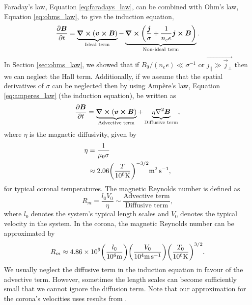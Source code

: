 Faraday's law, Equation \eqref{eq:faradays_law}, can be combined with Ohm's law, Equation \eqref{eq:ohms_law}, to give the induction equation,
\begin{equation}
    \label{eq:induction_equation}
    \pdv{\boldsymbol{B}}{t}=\underbrace{\curl(\boldsymbol{v}\cross\boldsymbol{B})}_{\text{Ideal term}}-\underbrace{\curl(\frac{\boldsymbol{j}}{\sigma}+\frac{1}{n_ee}\boldsymbol{j}\cross\boldsymbol{B})}_{\text{Non-ideal term}}.
\end{equation}
In Section \ref{sec:ohms_law}, we showed that if $B_0 / (n_e e) \ll \sigma^{-1}$ or $\vec{j_{||}\gg\vec{j}_\perp}$ then we can neglect the Hall term. Additionally, if we assume that the spatial derivatives of $\sigma$ can be neglected then by using Amp\`ere's law, Equation \eqref{eq:amperes_law} (the induction equation), be written as
\begin{equation}
    \pdv{\vec{B}}{t}=\underbrace{\curl(\vec{v}\cross\vec{B})}_{\text{Advective term}}+\underbrace{\eta\laplacian\vec{B}}_{\text{Diffusive term}},
\end{equation}
where $\eta$ is the magnetic diffusivity, given by
\begin{equation}
    \label{eq:eta_typical_values}
    \begin{aligned}
        \eta&=\frac{1}{\mu_0\sigma} \\
        &\approx 2.06\qty(\frac{T}{10^6\si{.K}})^{-3/2}\si{.m^2.s^{-1}},
    \end{aligned}
\end{equation}
for typical coronal temperatures. The magnetic Reynolds number is defined as
\begin{equation}
    R_m=\frac{l_0V_0}{\eta}\sim\frac{\text{Advective term}}{\text{Diffusive term}},
\end{equation}
where $l_0$ denotes the system's typical length scales and $V_0$ denotes the typical velocity in the system. In the corona, the magnetic Reynolds number can be approximated by
\begin{equation}
    \label{eq:mag_reynolds_number}
    R_m\approx4.86\times10^{9}\qty(\frac{l_0}{10^6\si{.m}})\qty(\frac{V_0}{10^4\si{.m.s^{-1}}})\qty(\frac{T_0}{10^6\si{.K}})^{3/2}.
\end{equation}
We usually neglect the diffusive term in the induction equation in favour of the advective term. However, sometimes the length scales can become sufficiently small that we cannot ignore the diffusion term. Note that our approximation for the corona's velocities uses results from \citet{McIntosh2011,McIntosh2012}.

